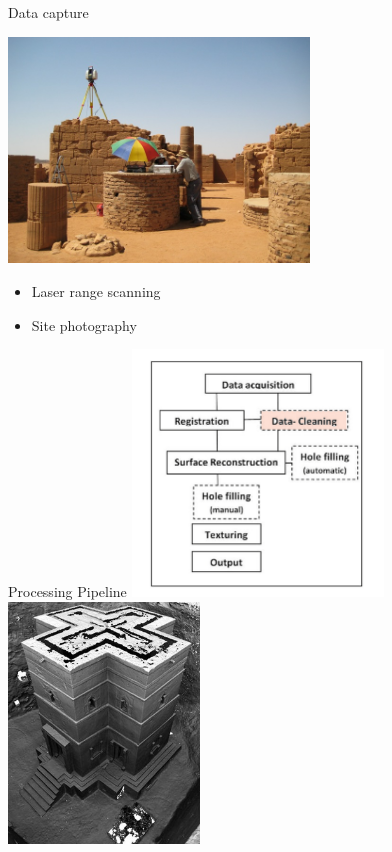 \documentclass{beamer}
\begin{document}
\begin{frame}{Data capture}

  \includegraphics[width=0.60\textwidth]{pics/scanning.jpg}
    \begin{itemize}
  \item
    Laser range scanning
  \item
    Site photography
  \end{itemize}
\end{frame}

\begin{frame}{Processing Pipeline}
  \includegraphics[width=0.50\textwidth]{pics/pipeline.png}
  \includegraphics[width=0.38\textwidth]{pics/zamani2.jpg}
\end{frame}
\end{document}
